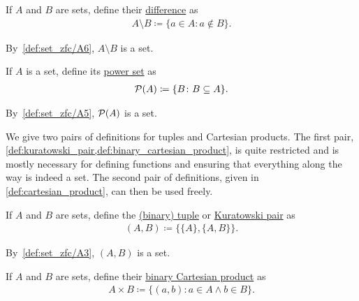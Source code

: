 \begin{definition}\label{def:set_difference}\cite[27]{Enderton1977}
  If $A$ and $B$ are sets, define their \ul{difference} as
  \begin{align*}
    A \setminus B \coloneqq \{ a \in A \colon a \not\in B \}.
  \end{align*}

  By~\ref{def:set_zfc/A6}, $A \setminus B$ is a set.
\end{definition}

\begin{definition}\label{def:power_set}\cite[19]{Enderton1977}
  If $A$ is a set, define its \ul{power set} as
  \begin{align*}
    \operatorname{\mathcal P}(A) \coloneqq \{ B \colon B \subseteq A \}.
  \end{align*}

  By~\ref{def:set_zfc/A5}, $\operatorname{\mathcal P}(A)$ is a set.
\end{definition}

\begin{note}
  We give two pairs of definitions for tuples and Cartesian products. The first pair, \cref{def:kuratowski_pair,def:binary_cartesian_product}, is quite restricted and is mostly necessary for defining functions and ensuring that everything along the way is indeed a set. The second pair of definitions, given in \cref{def:cartesian_product}, can then be used freely.
\end{note}

\begin{definition}\label{def:kuratowski_pair}\cite[36]{Enderton1977}
  If $A$ and $B$ are sets, define the \ul{(binary) tuple} or \ul{Kuratowski pair} as
  \begin{align*}
    (A, B) \coloneqq \{ \{ A \}, \{ A, B \} \}.
  \end{align*}

  By~\ref{def:set_zfc/A3}, $(A, B)$ is a set.
\end{definition}

\begin{definition}\label{def:binary_cartesian_product}\cite[37]{Enderton1977}
  If $A$ and $B$ are sets, define their \ul{binary Cartesian product} as
  \begin{align*}
    A \times B \coloneqq \{ (a, b) \colon a \in A \land b \in B \}.
  \end{align*}
\end{definition}

